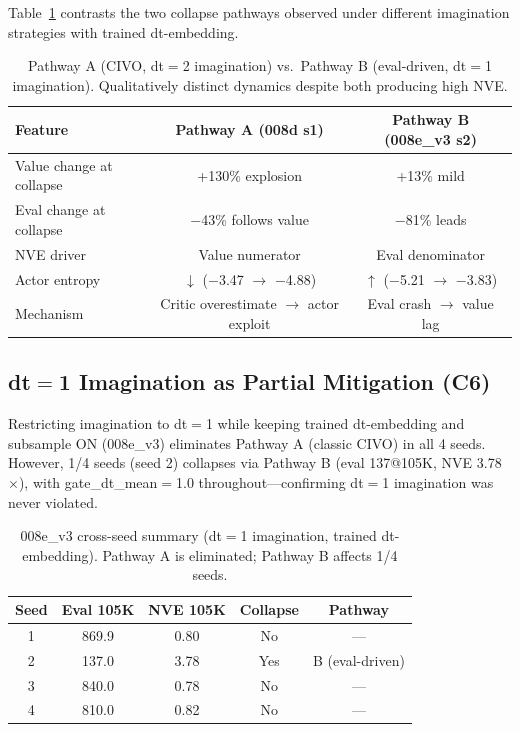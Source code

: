 \documentclass[10pt,letterpaper]{article}
\begin{document}
Table~\ref{tab:pathways} contrasts the two collapse pathways observed under different imagination strategies with trained dt-embedding.

\begin{table}[h]
\centering
\caption{Pathway A (CIVO, dt$=$2 imagination) vs.\ Pathway B (eval-driven, dt$=$1 imagination). Qualitatively distinct dynamics despite both producing high NVE.}
\label{tab:pathways}
\begin{tabular}{lcc}
\toprule
\textbf{Feature} & \textbf{Pathway A (008d s1)} & \textbf{Pathway B (008e\_v3 s2)} \\
\midrule
Value change at collapse & +130\% explosion & +13\% mild \\
Eval change at collapse & $-$43\% follows value & $-$81\% leads \\
NVE driver & Value numerator & Eval denominator \\
Actor entropy & $\downarrow$ ($-$3.47 $\to$ $-$4.88) & $\uparrow$ ($-$5.21 $\to$ $-$3.83) \\
Mechanism & Critic overestimate $\to$ actor exploit & Eval crash $\to$ value lag \\
\bottomrule
\end{tabular}
\end{table}

\subsection{dt$=$1 Imagination as Partial Mitigation (C6)}

Restricting imagination to dt$=$1 while keeping trained dt-embedding and subsample ON (008e\_v3) eliminates Pathway A (classic CIVO) in all 4 seeds.
However, 1/4 seeds (seed 2) collapses via Pathway B (eval 137@105K, NVE 3.78$\times$), with gate\_dt\_mean$=$1.0 throughout---confirming dt$=$1 imagination was never violated.

\begin{table}[h]
\centering
\caption{008e\_v3 cross-seed summary (dt$=$1 imagination, trained dt-embedding). Pathway A is eliminated; Pathway B affects 1/4 seeds.}
\label{tab:mitigation}
\begin{tabular}{ccccc}
\toprule
\textbf{Seed} & \textbf{Eval 105K} & \textbf{NVE 105K} & \textbf{Collapse} & \textbf{Pathway} \\
\midrule
1 & 869.9 & 0.80 & No & --- \\
2 & 137.0 & 3.78 & Yes & B (eval-driven) \\
3 & 840.0 & 0.78 & No & --- \\
4 & 810.0 & 0.82 & No & --- \\
\bottomrule
\end{tabular}
\end{table}
\end{document}
